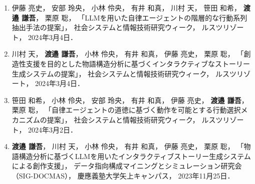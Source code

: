 \documentclass[a4j,12pt,dvipdfmx]{jsreport}
\begin{document}
\begin{enumerate}[label=(\roman*)]
   \item
         伊藤 亮史，
         安部 玲央，
         小林 伶央，
         有井 和真，
         川村 天，
         笹田 和希，
         \textbf{渡邉 謙吾}，
         栗原 聡，
         「LLMを用いた自律エージェントの階層的な行動系列抽出手法の提案」，
         社会システムと情報技術研究ウィーク，
         ルスツリゾート，
         2024年3月4日．

   \item
         川村 天，
         \textbf{渡邉 謙吾}，
         小林 伶央，
         有井 和真，
         伊藤 亮史，
         栗原 聡，
         「創造性支援を目的とした物語構造分析に基づくインタラクティブなストーリー生成システムの提案」，
         社会システムと情報技術研究ウィーク，
         ルスツリゾート，
         2024年3月4日．

   \item
         笹田 和希，
         小林 伶央，
         安部 玲央，
         有井 和真，
         伊藤 亮史，
         \textbf{渡邉 謙吾}，
         栗原 聡，
         「自律エージェントの道徳に基づく動作を可能とする行動選択メカニズムの提案」，
         社会システムと情報技術研究ウィーク，
         ルスツリゾート，
         2024年3月2日．

   \item
         \textbf{渡邉 謙吾}，
         川村 天，
         小林 伶央，
         有井 和真，
         伊藤 亮史，
         栗原 聡，
         「物語構造分析に基づくLLMを用いたインタラクティブストーリー生成システムによる創作支援」，
         データ指向構成マイニングとシミュレーション研究会（SIG-DOCMAS），
         慶應義塾大学矢上キャンパス，
         2023年11月25日．

\end{enumerate}

\ifdefined\ismain\else
   \printbibliography[title=参考文献]
\fi
\end{document}
